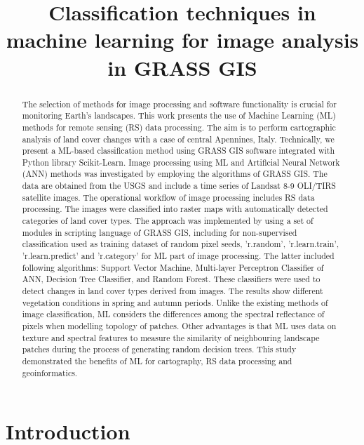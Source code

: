 \documentclass{elektr}
\title{Classification techniques in machine learning for image analysis in GRASS GIS}
\author[]{
	\rec{.202}
	\acc{.202}
	\finv{..202}
}
\begin{document}
\maketitle


\begin{abstract}The selection of methods for image processing and software functionality is crucial for monitoring Earth's landscapes. This work presents the use of Machine Learning (ML) methods for remote sensing (RS) data processing. The aim is to perform cartographic analysis of land cover changes with a case of central Apennines, Italy. Technically, we present a ML-based classification method using GRASS GIS software integrated with Python library Scikit-Learn. Image processing using ML and Artificial Neural Network (ANN) methods was investigated by employing the algorithms of GRASS GIS. The data are obtained from the USGS and include a time series of Landsat 8-9 OLI/TIRS satellite images. The operational workflow of image processing includes RS data processing. The images were classified into raster maps with automatically detected categories of land cover types. The approach was implemented by using a set of modules in scripting language of GRASS GIS, including for non-supervised classification used as training dataset of random pixel seeds, 'r.random', 'r.learn.train', 'r.learn.predict' and 'r.category' for ML part of image processing. The latter included following algorithms: Support Vector Machine, Multi-layer Perceptron Classifier of ANN, Decision Tree Classifier, and Random Forest. These classifiers were used to detect changes in land cover types derived from images. The results show different vegetation conditions in spring and autumn periods. Unlike the existing methods of image classification, ML considers the differences among the spectral reflectance of pixels when modelling topology of  patches. Other advantages is that ML uses data on texture and spectral features to measure the similarity of neighbouring landscape patches during the process of generating random decision trees.  This study demonstrated the benefits of ML for cartography, RS data processing and geoinformatics.

\end{abstract}

\section{Introduction}
\label{Int}
\end{document}
